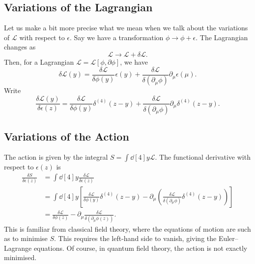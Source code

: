\subsection*{Variations of the Lagrangian}%

Let us make a bit more precise what we mean when we talk about the variations of $\mathscr{L}$ with respect to $\epsilon$.
Say we have a transformation $\phi \to \phi + \epsilon$. The Lagrangian changes as
\begin{equation}
  \mathscr{L} \to \mathscr{L} + \delta \mathscr{L}.
\end{equation}
Then, for a Lagrangian $\mathscr{L} = \mathscr{L}[\phi, \partial \phi]$, we have
\begin{equation}
  \delta \mathscr{L}(y) = \frac{\delta \mathscr{L}}{\delta \phi(y)} \epsilon(y) + \frac{\delta \mathscr{L}}{\delta (\partial_{\mu} \phi)} \partial_{\mu} \epsilon(\mu).
  \label{eq:19-star}
\end{equation}
Write
\begin{equation}
  \frac{\delta \mathscr{L}(y)}{\delta \epsilon(z)} = \frac{\delta \mathscr{L}}{\delta \phi(y)} \delta^{(4)} (z - y) + \frac{\delta \mathscr{L}}{\delta (\partial _{\mu} \phi)} \partial_{\mu} \delta^{(4)} (z - y).
\end{equation}

\subsection*{Variations of the Action}%

The action is given by the integral $S = \int \dd[4]{y} \mathscr{L}$.
The functional derivative with respect to $\epsilon(z)$ is
\begin{align}
  \frac{\delta S}{\delta \epsilon(z)} &= \int \dd[4]{y} \frac{\delta \mathscr{L}}{\delta \epsilon(z)} \\
				      &= \int \dd[4]{y} \left[ \frac{\delta \mathscr{L}}{\delta \phi(y)} \delta^{(4)} (z - y) - \partial_{\mu} \left( \frac{\delta \mathscr{L}}{\delta (\partial_{\mu} \phi)} \delta^{(4)}(z - y) \right) \right] \\
				      &= \frac{\delta \mathscr{L}}{\delta \phi(z)} - \partial_{\mu} \frac{\delta \mathscr{L}}{\delta (\partial_{\mu} \phi(z))}.
\end{align}
This is familiar from classical field theory, where the equations of motion are such as to minimise $S$. This requires the left-hand side to vanish, giving the Euler--Lagrange equations.
Of course, in quantum field theory, the action is not exactly minimised.

